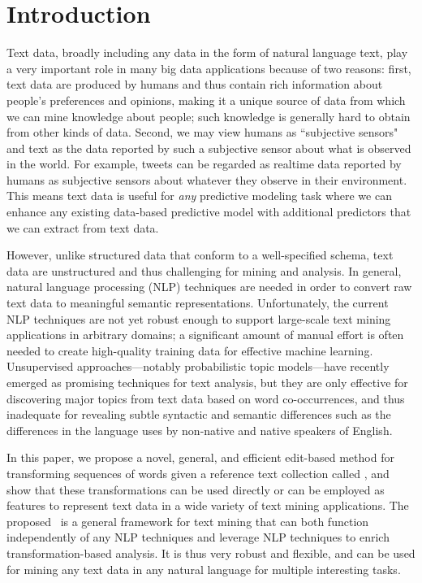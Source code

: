 \section{Introduction}
\label{sec:intro}

Text data, broadly including any data in the form of natural language text, play
a very important role in many big data applications because of two reasons:
first, text data are produced by humans and thus contain rich information about
people's preferences and opinions, making it a unique source of data from which
we can mine knowledge about people; such knowledge is generally hard to obtain
from other kinds of data. Second, we may view humans as ``subjective sensors"
and text as the data reported by such a subjective sensor about what is observed
in the world. For example, tweets can be regarded as realtime data reported by
humans as subjective sensors about whatever they observe in their environment.
This means text data is useful for {\em any} predictive modeling task where we
can enhance any existing data-based predictive model with additional predictors
that we can extract from text data.

However, unlike structured data that conform to a well-specified schema, text
data are unstructured and thus challenging for mining and analysis. In general,
natural language processing (NLP) techniques are needed in order to convert raw
text data to meaningful semantic representations. Unfortunately, the current NLP
techniques are not yet robust enough to support large-scale text mining
applications in arbitrary domains; a significant amount of manual effort is
often needed to create high-quality training data for effective machine
learning. Unsupervised approaches---notably probabilistic topic models---have
recently emerged as promising techniques for text analysis, but they are only
effective for discovering major topics from text data based on word
co-occurrences, and thus inadequate for revealing subtle syntactic and semantic
differences such as the differences in the language uses by non-native and
native speakers of English.

In this paper, we propose a novel, general, and efficient edit-based method for
transforming sequences of words given a reference text collection called \sd,
and show that these transformations can be used directly or can be employed as
features to represent text data in a wide variety of text mining applications.
The proposed \sd~is a general framework for text mining that can both function
independently of any NLP techniques and leverage NLP techniques to enrich
transformation-based analysis. It is thus very robust and flexible, and can be
used for mining any text data in any natural language for multiple interesting
tasks.

